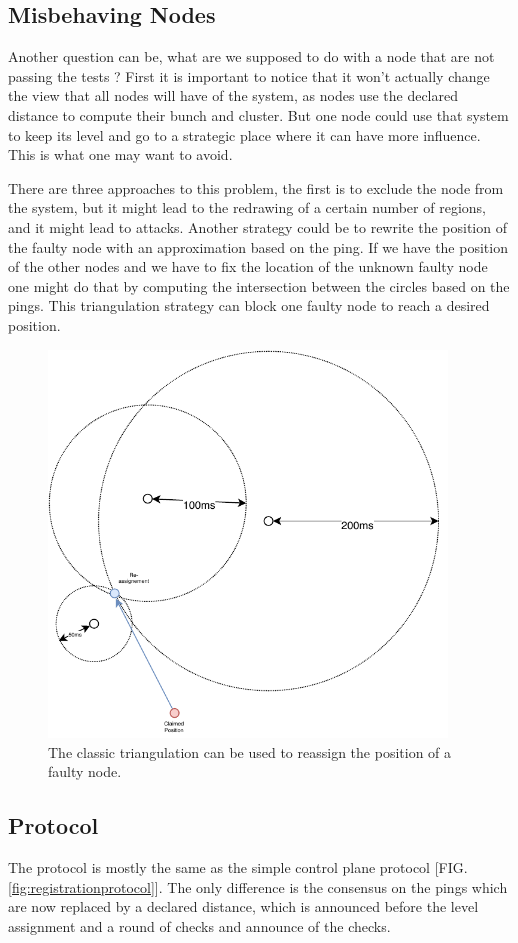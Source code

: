 \documentclass[a4paper,11pt,oneside]{report}
\begin{document}
\subsection{Misbehaving Nodes}
Another question can be, what are we supposed to do with a node that are not
passing the tests ? First it is important to notice that it won't actually
change the view that all nodes will have of the system, as nodes use the
declared distance to compute their bunch and cluster. But one node could use
that system to keep its level and go to a strategic place where it can have
more influence. This is what one may want to avoid. 

There are three approaches to this problem, the first is to exclude the node
from the system, but it might lead to the redrawing of a certain number of
regions, and it might lead to attacks. Another strategy could be to rewrite the
position of the faulty node with an approximation based on the ping. If we have
the position of the other nodes and we have to fix the location of the unknown
faulty node one might do that by computing the intersection between the circles
based on the pings. This triangulation strategy can block one faulty node to
reach a desired position. 

\begin{figure}[!h] 
\centering
\includegraphics[width=300pt]{figures/triangulation_strategy}
\caption{The classic triangulation can be used to reassign the position of a faulty node.  }
\label{fig:triangulation_strategy}
\end{figure}

\subsection{Protocol}
The protocol is mostly the same as the simple control plane protocol [FIG.
\ref{fig:registrationprotocol}]. The only difference is the consensus on the
pings which are now replaced by a declared distance, which is announced before
the level assignment and a round of checks and announce of the checks. 
\end{document}
